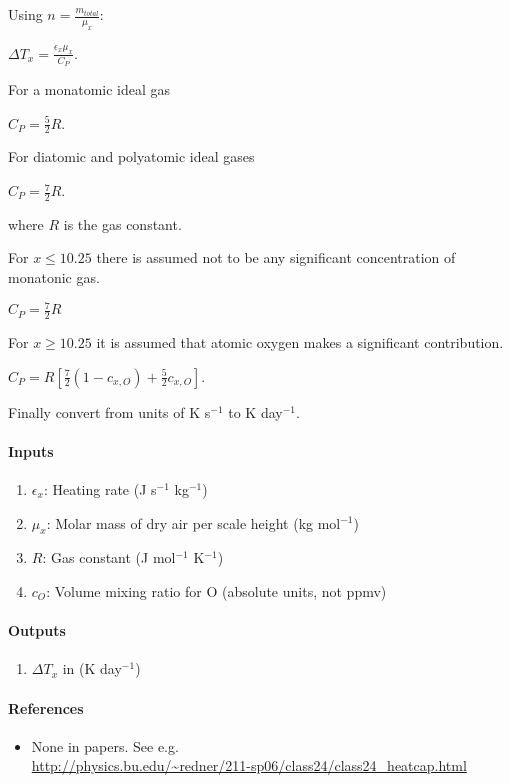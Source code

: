    Using $n = \frac{m_{total}}{\mu_x}$:

   \noindent $\Delta T_x = \frac{\epsilon_x \mu_x}{C_P}$.

   For a monatomic ideal gas

   \noindent $C_P = \frac{5}{2}R$.

   \noindent For diatomic and polyatomic ideal gases

   \noindent $C_P = \frac{7}{2}R$.
   
   \noindent where $R$ is the gas constant.

   For $x \leq 10.25$ there is assumed not to be any significant 
   concentration of monatonic gas.

   \noindent $C_P = \frac{7}{2}R$

   \noindent For $x \geq 10.25$ it is assumed that atomic oxygen makes a significant 
   contribution.

   \noindent $C_P = R[\frac{7}{2}(1 - c_{x,O}) + \frac{5}{2}c_{x,O}]$.

   Finally convert from units of K s$^{-1}$ to K day$^{-1}$.

   \paragraph{Inputs}
   \begin{enumerate}
   \item $\epsilon_x$: Heating rate (J s$^{-1}$ kg$^{-1}$)
   \item $\mu_x$: Molar mass of dry air per scale height (kg mol$^{-1}$)
   \item $R$: Gas constant (J mol$^{-1}$ K$^{-1}$)
   \item $c_O$: Volume mixing ratio for O (absolute units, not ppmv)
   \end{enumerate}

   \paragraph{Outputs}
   \begin{enumerate}
   \item $\Delta T_x$ in (K day$^{-1}$)
   \end{enumerate}

   \paragraph{References}
   \begin{itemize}
   \item None in papers. See e.g. \\
   \url{http://physics.bu.edu/~redner/211-sp06/class24/class24_heatcap.html}
   \end{itemize}

